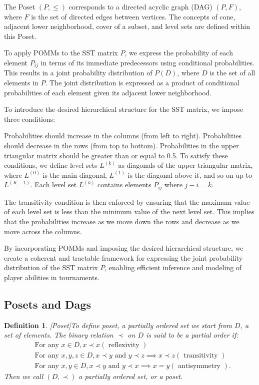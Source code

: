 \documentclass[11pt]{amsart}
\newtheorem{definition}{Definition}
\begin{document}
The Poset $(P, \leq)$ corresponds to a directed acyclic graph (DAG) $(P, F)$, where $F$ is the set of directed edges between vertices. The concepts of cone, adjacent lower neighborhood, cover of a subset, and level sets are defined within this Poset.

To apply POMMs to the SST matrix $P$, we express the probability of each element $P_{ij}$ in terms of its immediate predecessors using conditional probabilities. This results in a joint probability distribution of $P(D)$, where $D$ is the set of all elements in $P$. The joint distribution is expressed as a product of conditional probabilities of each element given its adjacent lower neighborhood.

To introduce the desired hierarchical structure for the SST matrix, we impose three conditions:

Probabilities should increase in the columns (from left to right).
Probabilities should decrease in the rows (from top to bottom).
Probabilities in the upper triangular matrix should be greater than or equal to 0.5.
To satisfy these conditions, we define level sets $L^{(k)}$ as diagonals of the upper triangular matrix, where $L^{(0)}$ is the main diagonal, $L^{(1)}$ is the diagonal above it, and so on up to $L^{(K-1)}$. Each level set $L^{(k)}$ contains elements $P_{ij}$ where $j - i = k$.

The transitivity condition is then enforced by ensuring that the maximum value of each level set is less than the minimum value of the next level set. This implies that the probabilities increase as we move down the rows and decrease as we move across the columns.

By incorporating POMMs and imposing the desired hierarchical structure, we create a coherent and tractable framework for expressing the joint probability distribution of the SST matrix $P$, enabling efficient inference and modeling of player abilities in tournaments.

\subsection{Posets and Dags}
\begin{definition}\label{def:Poset}[Poset]To define poset, a partially ordered set we start from $D$, a set of elements. The binary relation $\prec$ on $D$ is said to be a partial order if:
\begin{align}
&\text{For any } x \in D, x \prec x (\text{ reflexivity }) \\
&\text{For any } x,y,z \in D, x \prec y \text{ and } y \prec z \implies x \prec z (\text{ transitivity }) \\
&\text{For any } x, y \in D, x \prec y \text{ and } y \prec x \implies x = y (\text{ antisymmetry }).
\end{align}
Then we call $(D, \prec)$ a partially ordered set, or a \textit{poset}. 
\end{definition}
\end{document}
